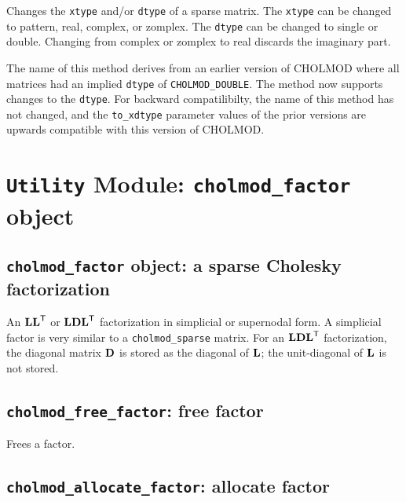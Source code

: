 \documentclass[11pt]{article}
\newcommand{\m}[1]{{\bf{#1}}}       %
\newcommand{\tr}{^{\sf T}}          %
\begin{document}

Changes the {\tt xtype} and/or \verb'dtype' of a sparse matrix.  The
\verb'xtype' can be changed to pattern, real, complex, or zomplex.  The
\verb'dtype' can be changed to single or double.  Changing from complex or
zomplex to real discards the imaginary part.

The name of this method derives from an earlier version of CHOLMOD where all
matrices had an implied \verb'dtype' of \verb'CHOLMOD_DOUBLE'.  The method now
supports changes to the \verb'dtype'.  For backward compatilibilty, the name of
this method has not changed, and the \verb'to_xdtype' parameter values of the
prior versions are upwards compatible with this version of CHOLMOD.

\newpage \section{{\tt Utility} Module: {\tt cholmod\_factor} object}
\label{cholmod_factor}

\subsection{{\tt cholmod\_factor} object: a sparse Cholesky factorization}


An $\m{LL}\tr$ or $\m{LDL}\tr$ factorization in simplicial or supernodal form.
A simplicial factor is very similar to a {\tt cholmod\_sparse} matrix.
For an $\m{LDL}\tr$ factorization, the diagonal matrix $\m{D}$ is stored
as the diagonal of $\m{L}$; the unit-diagonal of $\m{L}$ is not stored.

\subsection{{\tt cholmod\_free\_factor}: free factor}


Frees a factor.

\subsection{{\tt cholmod\_allocate\_factor}: allocate factor}
\end{document}
